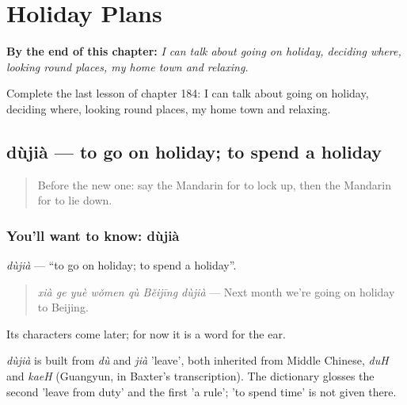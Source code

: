
\chapter{Holiday Plans}
\label{ch:zh-holiday-plans}

\begin{chapteropening}
\textbf{By the end of this chapter:} \emph{I can talk about going on holiday, deciding where, looking round places, my home town and relaxing.}

Complete the last lesson of chapter 184: I can talk about going on holiday, deciding where, looking round places, my home town and relaxing.
\end{chapteropening}

\section[dùjià]{dùjià — to go on holiday; to spend a holiday}

\label{lesson:ZH-C184-dujia}



\begin{quote}
Before the new one: say the Mandarin for to lock up, then the Mandarin for to lie down.
\end{quote}

\subsection*{You'll want to know: dùjià}
\emph{dùjià} — \textquotedblleft{}to go on holiday; to spend a holiday\textquotedblright{}.

\begin{quote}
\emph{xià ge yuè wǒmen qù Běijīng dùjià} — Next month we're going on holiday to Beijing.
\end{quote}

Its characters come later; for now it is a word for the ear.

\begin{cousinweb}
\emph{dùjià} is built from \emph{dù} and \emph{jià} 'leave', both inherited from Middle Chinese, \emph{duH} and \emph{kaeH} (Guangyun, in Baxter's transcription). The dictionary glosses the second 'leave from duty' and the first 'a rule'; 'to spend time' is not given there.
\end{cousinweb}

